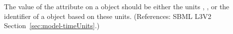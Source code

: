 The value of the attribute  on a \Model object should be
either the units , , or the identifier of a
\UnitDefinition object based on these units.  (References: SBML L3V2
Section~\ref{sec:model-timeUnits}.)
